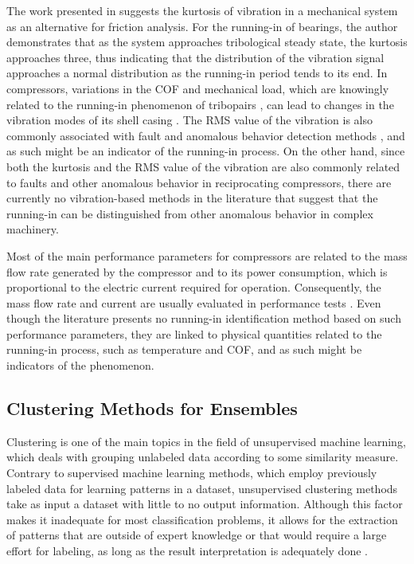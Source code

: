 \documentclass[preprint,11pt,number]{elsarticle}
\begin{document}
The work presented in \cite{martin_ASM_vibrationAnalysis} suggests the kurtosis of vibration in a mechanical system as an alternative for friction analysis. For the running-in of bearings, the author demonstrates that as the system approaches tribological steady state, the kurtosis approaches three, thus indicating that the distribution of the vibration signal approaches a normal distribution as the running-in period tends to its end. In compressors, variations in the COF and mechanical load, which are knowingly related to the running-in phenomenon of tribopairs \cite{Blau2009}, can lead to changes in the vibration modes of its shell casing \cite{Dreiman1998, Soedel2007}. The RMS value of the vibration is also commonly associated with fault and anomalous behavior detection methods \cite{Lv2022, Ahmed2012, Hou2023}, and as such might be an indicator of the running-in process. On the other hand, since both the kurtosis and the RMS value of the vibration are also commonly related to faults and other anomalous behavior in reciprocating compressors, there are currently no vibration-based methods in the literature that suggest that the running-in can be distinguished from other anomalous behavior in complex machinery.

Most of the main performance parameters for compressors are related to the mass flow rate generated by the compressor and to its power consumption, which is proportional to the electric current required for operation. Consequently, the mass flow rate and current are usually evaluated in performance tests \cite{Pacheco2022}. Even though the literature presents no running-in identification method based on such performance parameters, they are linked to physical quantities related to the running-in process, such as temperature and COF, and as such might be indicators of the phenomenon.

\subsection{Clustering Methods for Ensembles}\label{subsec:ClusteringMethods}

Clustering is one of the main topics in the field of unsupervised machine learning, which deals with grouping unlabeled data according to some similarity measure. Contrary to supervised machine learning methods, which employ previously labeled data for learning patterns in a dataset, unsupervised clustering methods take as input a dataset with little to no output information. Although this factor makes it inadequate for most classification problems, it allows for the extraction of patterns that are outside of expert knowledge or that would require a large effort for labeling, as long as the result interpretation is adequately done \cite{Duda2012}.
\end{document}

